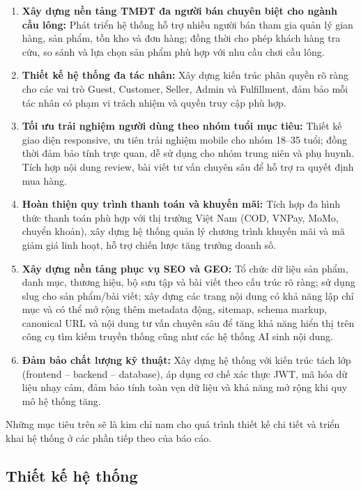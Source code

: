 \documentclass[13pt]{article}
\begin{document}
\begin{enumerate}
    \item \textbf{Xây dựng nền tảng TMĐT đa người bán chuyên biệt cho ngành cầu lông:} Phát triển hệ thống hỗ trợ nhiều người bán tham gia quản lý gian hàng, sản phẩm, tồn kho và đơn hàng; đồng thời cho phép khách hàng tra cứu, so sánh và lựa chọn sản phẩm phù hợp với nhu cầu chơi cầu lông.
    
    \item \textbf{Thiết kế hệ thống đa tác nhân:} Xây dựng kiến trúc phân quyền rõ ràng cho các vai trò Guest, Customer, Seller, Admin và Fulfillment, đảm bảo mỗi tác nhân có phạm vi trách nhiệm và quyền truy cập phù hợp.
    
    \item \textbf{Tối ưu trải nghiệm người dùng theo nhóm tuổi mục tiêu:} Thiết kế giao diện responsive, ưu tiên trải nghiệm mobile cho nhóm 18--35 tuổi; đồng thời đảm bảo tính trực quan, dễ sử dụng cho nhóm trung niên và phụ huynh. Tích hợp nội dung review, bài viết tư vấn chuyên sâu để hỗ trợ ra quyết định mua hàng.
    
    \item \textbf{Hoàn thiện quy trình thanh toán và khuyến mãi:} Tích hợp đa hình thức thanh toán phù hợp với thị trường Việt Nam (COD, VNPay, MoMo, chuyển khoản), xây dựng hệ thống quản lý chương trình khuyến mãi và mã giảm giá linh hoạt, hỗ trợ chiến lược tăng trưởng doanh số.
    
    \item \textbf{Xây dựng nền tảng phục vụ SEO và GEO:} Tổ chức dữ liệu sản phẩm, danh mục, thương hiệu, bộ sưu tập và bài viết theo cấu trúc rõ ràng; sử dụng slug cho sản phẩm/bài viết; xây dựng các trang nội dung có khả năng lập chỉ mục và có thể mở rộng thêm metadata động, sitemap, schema markup, canonical URL và nội dung tư vấn chuyên sâu để tăng khả năng hiển thị trên công cụ tìm kiếm truyền thống cũng như các hệ thống AI sinh nội dung.
    
    \item \textbf{Đảm bảo chất lượng kỹ thuật:} Xây dựng hệ thống với kiến trúc tách lớp (frontend -- backend -- database), áp dụng cơ chế xác thực JWT, mã hóa dữ liệu nhạy cảm, đảm bảo tính toàn vẹn dữ liệu và khả năng mở rộng khi quy mô hệ thống tăng.
\end{enumerate}

Những mục tiêu trên sẽ là kim chỉ nam cho quá trình thiết kế chi tiết và triển khai hệ thống ở các phần tiếp theo của báo cáo.
\subsection{Thiết kế hệ thống}
\end{document}
